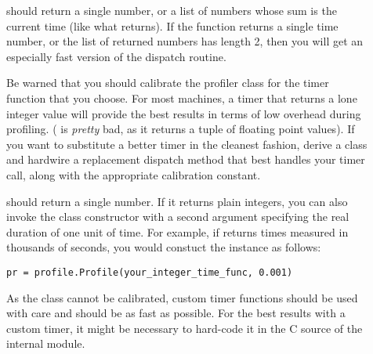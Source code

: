 \begin{description}
\item[]
 should return a single number, or a list of
numbers whose sum is the current time (like what 
returns).  If the function returns a single time number, or the list of
returned numbers has length 2, then you will get an especially fast
version of the dispatch routine.

Be warned that you should calibrate the profiler class for the
timer function that you choose.  For most machines, a timer that
returns a lone integer value will provide the best results in terms of
low overhead during profiling.  ( is
\emph{pretty} bad, as it returns a tuple of floating point values).  If
you want to substitute a better timer in the cleanest fashion,
derive a class and hardwire a replacement dispatch method that best
handles your timer call, along with the appropriate calibration
constant.

\item[]
 should return a single number.  If it returns
plain integers, you can also invoke the class constructor with a second
argument specifying the real duration of one unit of time.  For example,
if  returns times measured in thousands
of seconds, you would constuct the  instance as follows:

\begin{verbatim}
pr = profile.Profile(your_integer_time_func, 0.001)
\end{verbatim}

As the  class cannot be calibrated, custom
timer functions should be used with care and should be as fast as
possible.  For the best results with a custom timer, it might be
necessary to hard-code it in the C source of the internal
 module.

\end{description}
